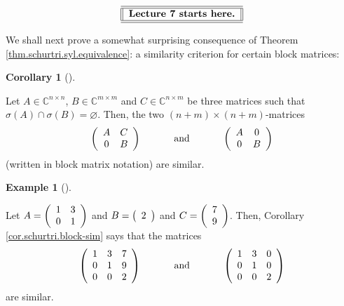 \documentclass[numbers=enddot,12pt,final,onecolumn,notitlepage]{scrartcl}%
\numberwithin{exer}{subsection}
\theoremstyle{definition}
\newtheorem{coro}[theo]{Corollary}
\newenvironment{corollary}[1][]
{\begin{coro}[#1]\begin{leftbar}}
{\end{leftbar}\end{coro}}
\newtheorem{exam}[theo]{Example}
\newenvironment{example}[1][]
{\begin{exam}[#1]\begin{leftbar}}
{\end{leftbar}\end{exam}}
\begin{document}
%

\[%
\begin{tabular}
[c]{||l||}\hline\hline
\textbf{Lecture 7 starts here.}\\\hline\hline
\end{tabular}
\]


We shall next prove a somewhat surprising consequence of Theorem
\ref{thm.schurtri.syl.equivalence}: a similarity criterion for certain block matrices:

\begin{corollary}
\label{cor.schurtri.block-sim}Let $A\in\mathbb{C}^{n\times n}$, $B\in
\mathbb{C}^{m\times m}$ and $C\in\mathbb{C}^{n\times m}$ be three matrices
such that $\sigma\left(  A\right)  \cap\sigma\left(  B\right)  =\varnothing$.
Then, the two $\left(  n+m\right)  \times\left(  n+m\right)  $-matrices%
\[
\left(
\begin{array}
[c]{cc}%
A & C\\
0 & B
\end{array}
\right)  \ \ \ \ \ \ \ \ \ \ \text{and}\ \ \ \ \ \ \ \ \ \ \left(
\begin{array}
[c]{cc}%
A & 0\\
0 & B
\end{array}
\right)
\]
(written in block matrix notation) are similar.
\end{corollary}

\begin{example}
Let $A=\left(
\begin{array}
[c]{cc}%
1 & 3\\
0 & 1
\end{array}
\right)  $ and $B=\left(
\begin{array}
[c]{c}%
2
\end{array}
\right)  $ and $C=\left(
\begin{array}
[c]{c}%
7\\
9
\end{array}
\right)  $. Then, Corollary \ref{cor.schurtri.block-sim} says that the
matrices%
\[
\left(
\begin{array}
[c]{ccc}%
1 & 3 & 7\\
0 & 1 & 9\\
0 & 0 & 2
\end{array}
\right)  \ \ \ \ \ \ \ \ \ \ \text{and}\ \ \ \ \ \ \ \ \ \ \left(
\begin{array}
[c]{ccc}%
1 & 3 & 0\\
0 & 1 & 0\\
0 & 0 & 2
\end{array}
\right)
\]
are similar.
\end{example}
\end{document}
